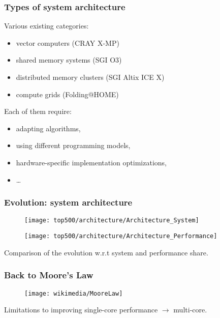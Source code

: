 \begin{frame}
  \frametitle{Types of system architecture}

Various existing categories:
\begin{itemize}
\item vector computers (CRAY X-MP)
\item shared memory systems (SGI O3)
\item distributed memory clusters (SGI Altix ICE X)
\item compute grids (Folding@HOME)
\end{itemize}

\vspace{2ex}

Each of them require:
\begin{itemize}
\item adapting algorithms,
\item using different programming models,
\item hardware-specific implementation optimizations,
\item \dots
\end{itemize}

\end{frame}

\begin{frame}
  \frametitle{Evolution: system architecture}

\begin{minipage}[bc]{0.4\linewidth}
\centering
\begin{figure}
\centering
\texttt{[image: top500/architecture/Architecture\_System]}
\end{figure}
\end{minipage}
\begin{minipage}[bc]{0.4\linewidth}
\centering
\begin{figure}
\centering
\texttt{[image: top500/architecture/Architecture\_Performance]}
\end{figure}
\end{minipage}

\smallskip
Comparison of the evolution w.r.t system and performance share.
\end{frame}

\begin{frame}
  \frametitle{Back to Moore's Law}
\begin{figure}
\centering
\texttt{[image: wikimedia/MooreLaw]}
\end{figure}

Limitations to improving single-core performance $\rightarrow$ multi-core.

\end{frame}

